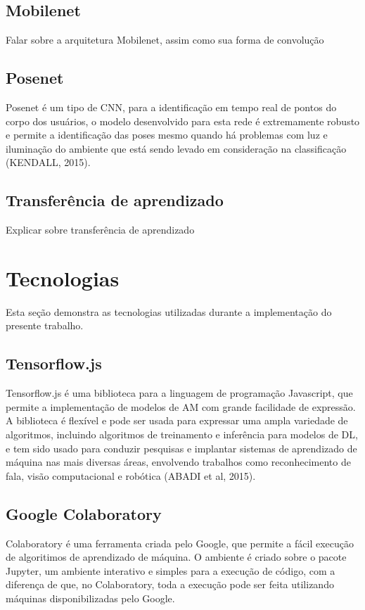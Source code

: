 \subsection{Mobilenet}

Falar sobre a arquitetura Mobilenet, assim como sua forma de convolução

\subsection{Posenet}

\par Posenet é um tipo de CNN, para a identificação em tempo real de pontos do corpo dos usuários, o modelo desenvolvido para esta rede é extremamente robusto e permite a identificação das poses mesmo quando há problemas com luz e iluminação do ambiente que está sendo levado em consideração na classificação (KENDALL, 2015). 

\subsection{Transferência de aprendizado}

\par Explicar sobre transferência de aprendizado

\section{Tecnologias}

Esta seção demonstra as tecnologias utilizadas durante a implementação do presente trabalho.

\subsection{Tensorflow.js}

Tensorflow.js é uma biblioteca para a linguagem de programação Javascript, que permite a implementação de modelos de AM com grande facilidade de expressão. A biblioteca é flexível e pode ser usada para expressar uma ampla variedade de algoritmos, incluindo algoritmos de treinamento e inferência para modelos de DL, e tem sido usado para conduzir pesquisas e implantar sistemas de aprendizado de máquina nas mais diversas áreas, envolvendo trabalhos como reconhecimento de fala, visão computacional e robótica (ABADI et al, 2015). 

\subsection{Google Colaboratory}

Colaboratory é uma ferramenta criada pelo Google, que permite a fácil execução de algoritimos de aprendizado de máquina. O ambiente é criado sobre o pacote Jupyter, um ambiente interativo e simples para a execução de código, com a diferença de que, no Colaboratory, toda a execução pode ser feita utilizando máquinas disponibilizadas pelo Google.
